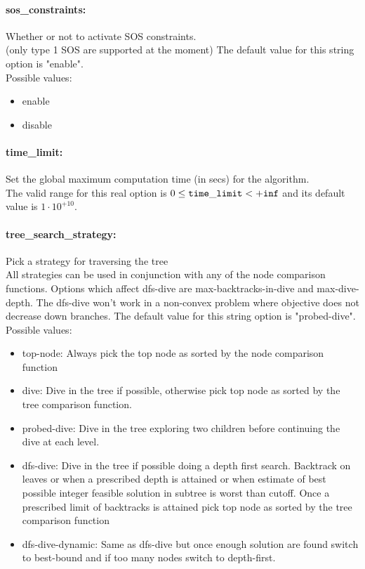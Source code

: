 \paragraph{sos\_constraints:}\label{opt:sos_constraints} Whether or not to activate SOS constraints. \\
 (only type 1 SOS are supported at the moment) The default value for this string option is "enable".
\\ 
Possible values:
\begin{itemize}
   \item enable
   \item disable
\end{itemize}

\paragraph{time\_limit:}\label{opt:time_limit} Set the global maximum computation time (in secs) for the algorithm. \\
 The valid range for this real option is 
$0 \le {\tt time\_limit } <  {\tt +inf}$
and its default value is $1 \cdot 10^{+10}$.


\paragraph{tree\_search\_strategy:}\label{opt:tree_search_strategy} Pick a strategy for traversing the tree \\
 All strategies can be used in conjunction with any of the node comparison functions. Options which affect dfs-dive are max-backtracks-in-dive and max-dive-depth. The dfs-dive won't work in a non-convex problem where objective does not decrease down branches. The default value for this string option is "probed-dive".
\\ 
Possible values:
\begin{itemize}
   \item top-node:  Always pick the top node as sorted by the node comparison function
   \item dive: Dive in the tree if possible, otherwise pick top node as sorted by the tree comparison function.
   \item probed-dive: Dive in the tree exploring two children before continuing the dive at each level.
   \item dfs-dive: Dive in the tree if possible doing a depth first search. Backtrack on leaves or when a prescribed depth is attained or when estimate of best possible integer feasible solution in subtree is worst than cutoff. Once a prescribed limit of backtracks is attained pick top node as sorted by the tree comparison function
   \item dfs-dive-dynamic: Same as dfs-dive but once enough solution are found switch to best-bound and if too many nodes switch to depth-first.
\end{itemize}

